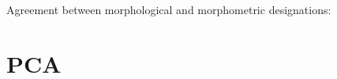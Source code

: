 \documentclass{article}
\begin{document}



Agreement between morphological and morphometric designations:


\section{PCA}













\end{document}
